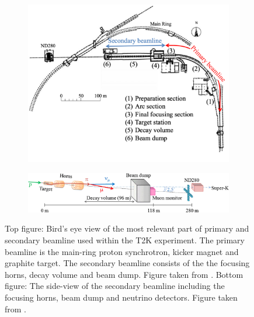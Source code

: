 \begin{figure}[h]
  \begin{subfigure}[t]{0.7\textwidth}
    \includegraphics[width=\textwidth, trim={0mm 0mm 0mm 0mm}, clip,page=1]{Figures/Detectors/T2KBeamline.pdf}
  \end{subfigure}
  \begin{subfigure}[t]{0.95\textwidth}
    \vspace{0.5cm}
    \includegraphics[width=\textwidth, trim={0mm 0mm 0mm 0mm}, clip,page=1]{Figures/Detectors/T2KSecondaryBeamline.jpg}
  \end{subfigure}
  \caption{Top figure: Bird's eye view of the most relevant part of primary and secondary beamline used within the T2K experiment. The primary beamline is the main-ring proton synchrotron, kicker magnet and graphite target. The secondary beamline consists of the the focusing horns, decay volume and beam dump. Figure taken from \cite{t2k_det}. Bottom figure: The side-view of the secondary beamline including the focusing horns, beam dump and neutrino detectors. Figure taken from \cite{MuMon}.}
  \label{fig:T2KSKExp_T2K_Beamline}
\end{figure}

